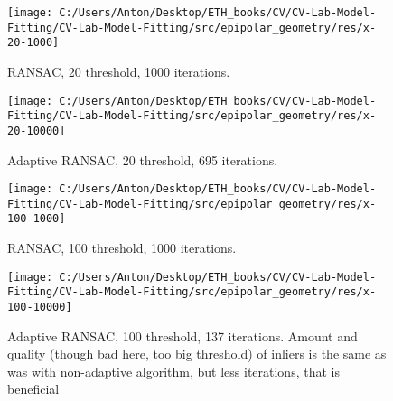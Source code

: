 \documentclass{report}
\begin{document}
\begin{figure}[h!]
	\begin{center}
		\begin{minipage}[h]{0.9\linewidth}
			\texttt{[image: C:/Users/Anton/Desktop/ETH\_books/CV/CV-Lab-Model-Fitting/CV-Lab-Model-Fitting/src/epipolar\_geometry/res/x-20-1000]}
			\caption{RANSAC, 20 threshold, 1000 iterations.}
		\end{minipage}
	\end{center}
\end{figure}
\begin{figure}[h!]
	\begin{center}
		\begin{minipage}[h]{0.9\linewidth}
			\texttt{[image: C:/Users/Anton/Desktop/ETH\_books/CV/CV-Lab-Model-Fitting/CV-Lab-Model-Fitting/src/epipolar\_geometry/res/x-20-10000]}
			\caption{Adaptive RANSAC, 20 threshold, 695 iterations.}
		\end{minipage}
	\end{center}
\end{figure}
\begin{figure}[h!]
	\begin{center}
		\begin{minipage}[h]{0.9\linewidth}
			\texttt{[image: C:/Users/Anton/Desktop/ETH\_books/CV/CV-Lab-Model-Fitting/CV-Lab-Model-Fitting/src/epipolar\_geometry/res/x-100-1000]}
			\caption{RANSAC, 100 threshold, 1000 iterations.}
		\end{minipage}
	\end{center}
\end{figure}
\begin{figure}[h!]
	\begin{center}
		\begin{minipage}[h]{0.9\linewidth}
			\texttt{[image: C:/Users/Anton/Desktop/ETH\_books/CV/CV-Lab-Model-Fitting/CV-Lab-Model-Fitting/src/epipolar\_geometry/res/x-100-10000]}
			\caption{Adaptive RANSAC, 100 threshold, 137 iterations. Amount and quality (though bad here, too big threshold) of inliers is the same as was with non-adaptive algorithm, but less iterations, that is beneficial}
		\end{minipage}
	\end{center}
\end{figure}
\end{document}
